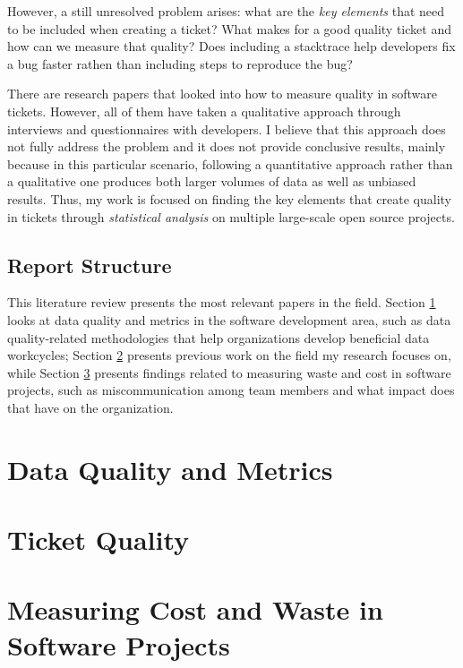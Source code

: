 \documentclass[11pt,english,twocolumn]{article}
\begin{document}
However, a still unresolved problem arises: what are the \emph{key 
elements} that need to be included when creating a ticket? What makes for a good quality ticket
and how can we measure that quality? Does including a stacktrace help developers fix a bug 
faster rathen than including steps to reproduce the bug?

There are research papers that looked into how to measure quality in software tickets. However,
all of them have taken a qualitative approach through interviews and questionnaires with
developers. I believe that this approach does not fully address the problem and it does not provide
conclusive results, mainly because in this particular scenario, following a quantitative approach
rather than a qualitative one produces both larger volumes of data as well as unbiased results.
Thus, my work is focused on finding the key elements that create quality
in tickets through \emph{statistical analysis} on multiple large-scale open source projects.

\subsection*{Report Structure}
\label{sec:label-subsection}

This literature review presents the most relevant papers in the field. Section 
\ref{sec:data-quality} looks at data quality and metrics in the software development area, 
such as data quality-related methodologies that help organizations develop beneficial 
data workcycles; Section \ref{sec:ticket-quality} presents previous work on the field my 
research focuses on, while Section \ref{sec:measuring-waste} presents findings related 
to measuring waste and cost in software projects, such as miscommunication among team 
members and what impact does that have on the organization.

\section{Data Quality and Metrics}
\label{sec:data-quality}

\section{Ticket Quality}
\label{sec:ticket-quality}

\section{Measuring Cost and Waste in Software Projects}
\label{sec:measuring-waste}

\let\oldbibliography\thebibliography
\renewcommand{\thebibliography}[1]{\oldbibliography{#1}
\setlength{\itemsep}{-3pt}}


{
\scriptsize

}
\end{document}

